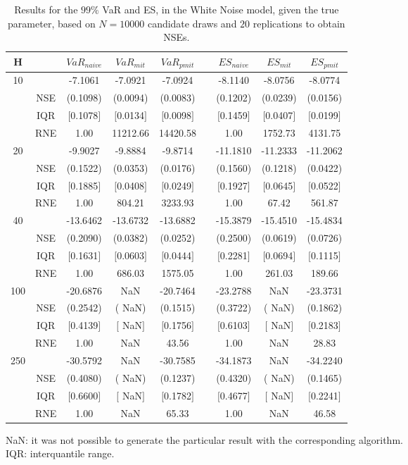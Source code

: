 \begin{table}[h] 
\centering 
\caption{Results for the $99\%$ VaR and ES, in the White Noise model, given the true parameter, based on $N=10000$ candidate draws and $20$ replications to obtain NSEs.} 
\label{tab:res_algos_WN_ML} 
\begin{tabular}{ccccccccc}  
 H & & $VaR_{naive}$ & $VaR_{mit}$ & $VaR_{pmit}$ &  & $ES_{naive}$ & $ES_{mit}$ & $ES_{pmit}$ \\ \hline 
10 & & -7.1061 & -7.0921 & -7.0924 & & -8.1140 & -8.0756 & -8.0774  \\ 
  & NSE & (0.1098) & (0.0094) & (0.0083) & & (0.1202) & (0.0239) & (0.0156)   \\ 
 & IQR & $[$0.1078$]$ & $[$0.0134$]$ & $[$0.0098$]$ & & $[$0.1459$]$ & $[$0.0407$]$ & $[$0.0199$]$  \\  
  & RNE &   1.00 & 11212.66 & 14420.58 & &   1.00 & 1752.73 & 4131.75   \\ [1ex] 
20 & & -9.9027 & -9.8884 & -9.8714 & & -11.1810 & -11.2333 & -11.2062  \\ 
  & NSE & (0.1522) & (0.0353) & (0.0176) & & (0.1560) & (0.1218) & (0.0422)   \\ 
 & IQR & $[$0.1885$]$ & $[$0.0408$]$ & $[$0.0249$]$ & & $[$0.1927$]$ & $[$0.0645$]$ & $[$0.0522$]$  \\  
  & RNE &   1.00 & 804.21 & 3233.93 & &   1.00 &  67.42 & 561.87   \\ [1ex] 
40 & & -13.6462 & -13.6732 & -13.6882 & & -15.3879 & -15.4510 & -15.4834  \\ 
  & NSE & (0.2090) & (0.0382) & (0.0252) & & (0.2500) & (0.0619) & (0.0726)   \\ 
 & IQR & $[$0.1631$]$ & $[$0.0603$]$ & $[$0.0444$]$ & & $[$0.2281$]$ & $[$0.0694$]$ & $[$0.1115$]$  \\  
  & RNE &   1.00 & 686.03 & 1575.05 & &   1.00 & 261.03 & 189.66   \\ [1ex] 
100 & & -20.6876 &    NaN & -20.7464 & & -23.2788 &    NaN & -23.3731  \\ 
  & NSE & (0.2542) & (   NaN) & (0.1515) & & (0.3722) & (   NaN) & (0.1862)   \\ 
 & IQR & $[$0.4139$]$ & $[$   NaN$]$ & $[$0.1756$]$ & & $[$0.6103$]$ & $[$   NaN$]$ & $[$0.2183$]$  \\  
  & RNE &   1.00 &    NaN &  43.56 & &   1.00 &    NaN &  28.83   \\ [1ex] 
250 & & -30.5792 &    NaN & -30.7585 & & -34.1873 &    NaN & -34.2240  \\ 
  & NSE & (0.4080) & (   NaN) & (0.1237) & & (0.4320) & (   NaN) & (0.1465)   \\ 
 & IQR & $[$0.6600$]$ & $[$   NaN$]$ & $[$0.1782$]$ & & $[$0.4677$]$ & $[$   NaN$]$ & $[$0.2241$]$  \\  
  & RNE &   1.00 &    NaN &  65.33 & &   1.00 &    NaN &  46.58   \\ [1ex] 
\hline 
\end{tabular} 
\raggedright 

\vspace{5pt}\footnotesize{NaN: it was not possible to generate the particular result with the corresponding algorithm.} \\ 
\vspace{5pt}\footnotesize{IQR: interquantile range.} 
\end{table} 
